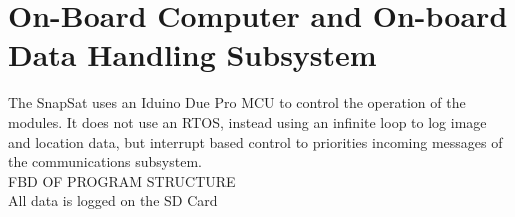 \section{On-Board Computer and On-board Data Handling Subsystem}

The SnapSat uses an Iduino Due Pro MCU to control the operation of the modules.  It does not use an RTOS, instead using an infinite loop to log image and location data, but interrupt based control to priorities incoming messages of the communications subsystem. \\

FBD OF PROGRAM STRUCTURE \\

All data is logged on the SD Card 